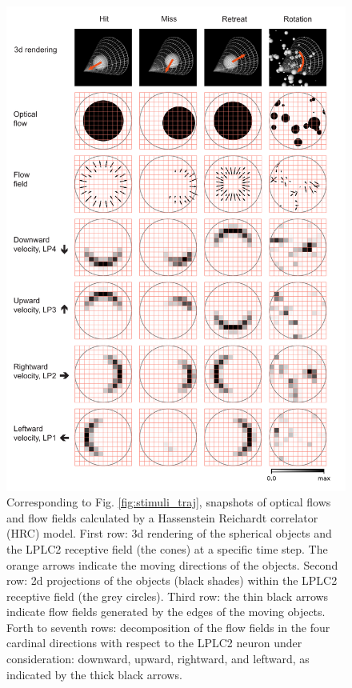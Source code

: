 \documentclass[pdftex,9pt,lineno]{elife}
\begin{document}
\begin{figure}
\includegraphics[width=\linewidth]{figures/stimuli_2_paper.pdf}
\caption{Corresponding to Fig. \ref{fig:stimuli_traj}, snapshots of optical flows and flow fields calculated by a Hassenstein Reichardt correlator (HRC) model. First row: 3d rendering of the spherical objects and the LPLC2 receptive field (the cones) at a specific time step. The orange arrows indicate the moving directions of the objects. Second row: 2d projections of the objects (black shades) within the LPLC2 receptive field (the grey circles). Third row: the thin black arrows indicate flow fields generated by the edges of the moving objects. Forth to seventh rows: decomposition of the flow fields in the four cardinal directions with respect to the LPLC2 neuron under consideration: downward, upward, rightward, and leftward, as indicated by the thick black arrows.}
\label{fig:stimuli_flow}

\end{figure}
\end{document}
